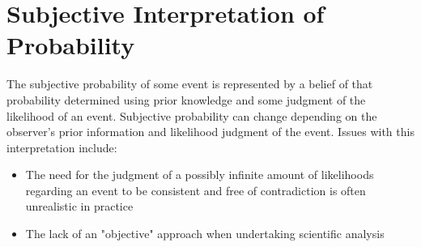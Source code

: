 \documentclass[fleqn]{article}
\begin{document}
\section{Subjective Interpretation of Probability} 
The subjective probability of some event is represented by a belief of that probability determined using prior knowledge and some judgment of the likelihood of an event. Subjective probability can change depending on the observer's prior information and likelihood judgment of the event. Issues with this interpretation include:
\begin{itemize}
	\item The need for the judgment of a possibly infinite amount of likelihoods regarding an event to be consistent and free of contradiction is often unrealistic in practice
	\item The lack of an "objective" approach when undertaking scientific analysis
\end{itemize}
\end{document}
